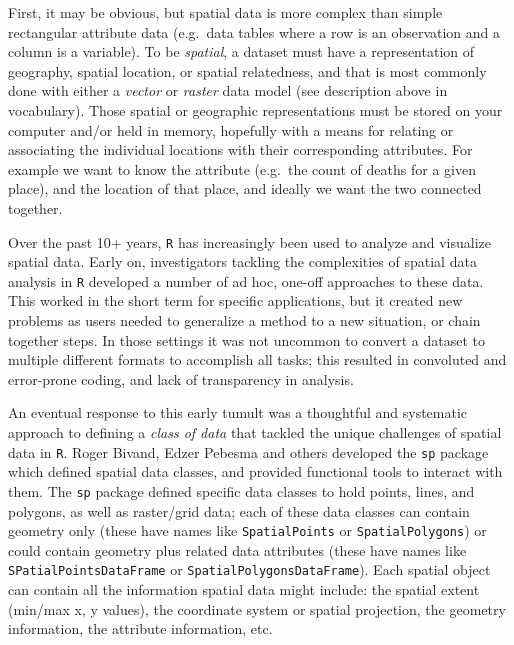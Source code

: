 \documentclass[
]{book}
\newcommand{\passthrough}[1]{#1}
\begin{document}
First, it may be obvious, but spatial data is more complex than simple rectangular attribute data (e.g.~data tables where a row is an observation and a column is a variable). To be \emph{spatial}, a dataset must have a representation of geography, spatial location, or spatial relatedness, and that is most commonly done with either a \emph{vector} or \emph{raster} data model (see description above in vocabulary). Those spatial or geographic representations must be stored on your computer and/or held in memory, hopefully with a means for relating or associating the individual locations with their corresponding attributes. For example we want to know the attribute (e.g.~the count of deaths for a given place), and the location of that place, and ideally we want the two connected together.

Over the past 10+ years, \passthrough{\lstinline!R!} has increasingly been used to analyze and visualize spatial data. Early on, investigators tackling the complexities of spatial data analysis in \passthrough{\lstinline!R!} developed a number of ad hoc, one-off approaches to these data. This worked in the short term for specific applications, but it created new problems as users needed to generalize a method to a new situation, or chain together steps. In those settings it was not uncommon to convert a dataset to multiple different formats to accomplish all tasks; this resulted in convoluted and error-prone coding, and lack of transparency in analysis.

An eventual response to this early tumult was a thoughtful and systematic approach to defining a \emph{class of data} that tackled the unique challenges of spatial data in \passthrough{\lstinline!R!}. Roger Bivand, Edzer Pebesma and others developed the \passthrough{\lstinline!sp!} package which defined spatial data classes, and provided functional tools to interact with them. The \passthrough{\lstinline!sp!} package defined specific data classes to hold points, lines, and polygons, as well as raster/grid data; each of these data classes can contain geometry only (these have names like \passthrough{\lstinline!SpatialPoints!} or \passthrough{\lstinline!SpatialPolygons!}) or could contain geometry plus related data attributes (these have names like \passthrough{\lstinline!SPatialPointsDataFrame!} or \passthrough{\lstinline!SpatialPolygonsDataFrame!}). Each spatial object can contain all the information spatial data might include: the spatial extent (min/max x, y values), the coordinate system or spatial projection, the geometry information, the attribute information, etc.
\end{document}
